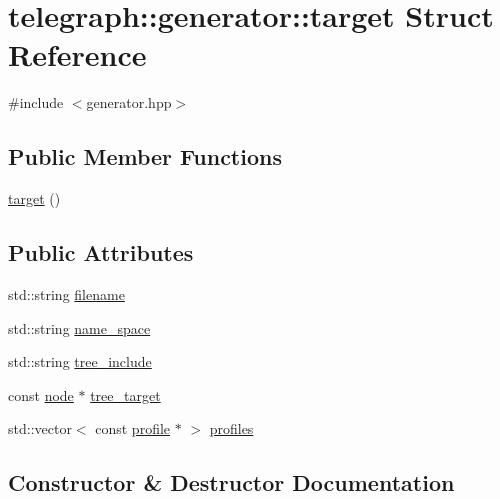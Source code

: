 \hypertarget{structtelegraph_1_1generator_1_1target}{}\section{telegraph\+:\+:generator\+:\+:target Struct Reference}
\label{structtelegraph_1_1generator_1_1target}


{\ttfamily \#include $<$generator.\+hpp$>$}

\subsection*{Public Member Functions}
\begin{DoxyCompactItemize}
\item 
\hyperlink{structtelegraph_1_1generator_1_1target_a99ead371ab5d5fa9a5d33ed38394cc8d}{target} ()
\end{DoxyCompactItemize}
\subsection*{Public Attributes}
\begin{DoxyCompactItemize}
\item 
std\+::string \hyperlink{structtelegraph_1_1generator_1_1target_afe5f00222e1bc22846632ec37614226f}{filename}
\item 
std\+::string \hyperlink{structtelegraph_1_1generator_1_1target_abcbb3fbc6891d3298dd5c1e5632dadfa}{name\+\_\+space}
\item 
std\+::string \hyperlink{structtelegraph_1_1generator_1_1target_aae55a691127405908abada75477f234a}{tree\+\_\+include}
\item 
const \hyperlink{classtelegraph_1_1node}{node} $\ast$ \hyperlink{structtelegraph_1_1generator_1_1target_acbc17bb4f9cf53165d08b55841364260}{tree\+\_\+target}
\item 
std\+::vector$<$ const \hyperlink{classtelegraph_1_1profile}{profile} $\ast$ $>$ \hyperlink{structtelegraph_1_1generator_1_1target_ab6790d8a369d72b032ad122d94b0beaf}{profiles}
\end{DoxyCompactItemize}


\subsection{Constructor \& Destructor Documentation}
\mbox{\label{structtelegraph_1_1generator_1_1target_a99ead371ab5d5fa9a5d33ed38394cc8d}} 
